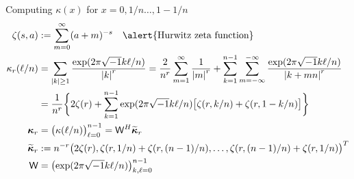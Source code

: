 \documentclass[10pt,compress,xcolor={usenames,dvipsnames},aspectratio=169]{beamer}
\newcommand{\talert}[1]{\alert{\text{#1}}}
\begin{document}
\begin{frame}[label=kappaDeriv]{Computing $\kappa(x)$ for $x = 0, 1/n \ldots, 1-1/n$}
	\vspace{-8ex}
	\begin{align*}
	\zeta(s,a) &: = \sum_{m=0}^\infty (a+m)^{-s}  \quad \talert{Hurwitz zeta function}\\
	\kappa_r(\ell/n) & = \sum_{\abs{k} \ge 1} \frac{\exp(2\pi\sqrt{-1} k\ell/n)}{\abs{k}^{r}} 
	= \frac{2}{n^{r}}  \sum_{m=1}^\infty \frac{1}{\abs{m}^{r}} 
	+ 
	\sum_{k=1}^{n-1}  \sum_{m=-\infty}^{-\infty} \frac{\exp(2\pi\sqrt{-1} k\ell/n)}{\abs{k+mn}^{r}} 
	\\
	& = \frac{1}{n^{r}} \biggl\{2\zeta(r)
	+ 
	\sum_{k=1}^{n - 1} \exp(2\pi\sqrt{-1} k\ell/n) \bigl[ \zeta(r,k/n) + \zeta(r,1-k/n)\bigr] \biggr\} \\
	\vkappa_r & = \bigl( \kappa(\ell/n) \bigr)_{\ell = 0}^{n-1} = \mW^H \widetilde{\vkappa}_r \\
	\widetilde{\vkappa}_r & : = n^{-r}\bigl(2 \zeta(r), \zeta(r,1/n) + \zeta(r,(n-1)/n), \ldots, \zeta(r,(n-1)/n) + \zeta(r,1/n)  \bigr)^T \\
	\mW & = \bigl(\exp( 2 \pi \sqrt{-1} k \ell/n)\bigr)_{k,\ell =0}^{n-1}
	\end{align*}
	\hyperlink{flexible<3>}{}
\end{frame}
\end{document}
